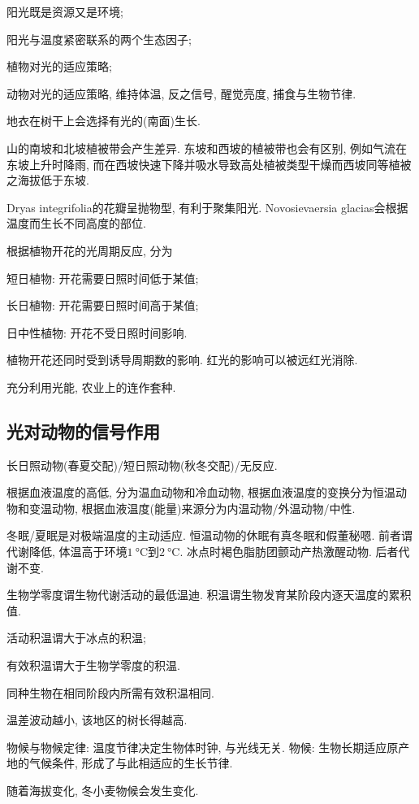 \documentclass{ctexart}
\begin{document}
\begin{cenum}
    \item 阳光既是资源又是环境;
    \item 阳光与温度紧密联系的两个生态因子;
    \item 植物对光的适应策略;
    \item 动物对光的适应策略, 维持体温, 反之信号, 醒觉亮度, 捕食与生物节律.
\end{cenum}
\begin{ex}
    地衣在树干上会选择有光的(南面)生长.
\end{ex}
\begin{ex}
    山的南坡和北坡植被带会产生差异. 东坡和西坡的植被带也会有区别, 例如气流在东坡上升时降雨, 而在西坡快速下降并吸水导致高处植被类型干燥而西坡同等植被之海拔低于东坡.
\end{ex}
\begin{ex}
    Dryas integrifolia的花瓣呈抛物型, 有利于聚集阳光. Novosievaersia glacias会根据温度而生长不同高度的部位.
\end{ex}
根据植物开花的光周期反应, 分为
\begin{cenum}
    \item 短日植物: 开花需要日照时间低于某值;
    \item 长日植物: 开花需要日照时间高于某值;
    \item 日中性植物: 开花不受日照时间影响.
\end{cenum}
植物开花还同时受到诱导周期数的影响. 红光的影响可以被远红光消除.
\begin{ex}
    充分利用光能, 农业上的连作套种.
\end{ex}


\subsection{光对动物的信号作用} %
\label{sub:光对动物的信号作用}

长日照动物(春夏交配)/短日照动物(秋冬交配)/无反应.
\par
根据血液温度的高低, 分为温血动物和冷血动物, 根据血液温度的变换分为恒温动物和变温动物, 根据血液温度(能量)来源分为内温动物/外温动物/中性.
\par
冬眠/夏眠是对极端温度的主动适应. 恒温动物的休眠有真冬眠和假董秘嗯. 前者谓代谢降低, 体温高于环境$\SI{1}{\celsius}$到$\SI{2}{\celsius}$. 冰点时褐色脂肪团颤动产热激醒动物. 后者代谢不变.
\par
生物学零度谓生物代谢活动的最低温迪. 积温谓生物发育某阶段内逐天温度的累积值.
\begin{cenum}
    \item 活动积温谓大于冰点的积温;
    \item 有效积温谓大于生物学零度的积温.
\end{cenum}
同种生物在相同阶段内所需有效积温相同.
\par
温差波动越小, 该地区的树长得越高.
\par
物候与物候定律: 温度节律决定生物体时钟, 与光线无关. 物候: 生物长期适应原产地的气候条件, 形成了与此相适应的生长节律.
\begin{ex}
    随着海拔变化, 冬小麦物候会发生变化.
\end{ex}
\end{document}
